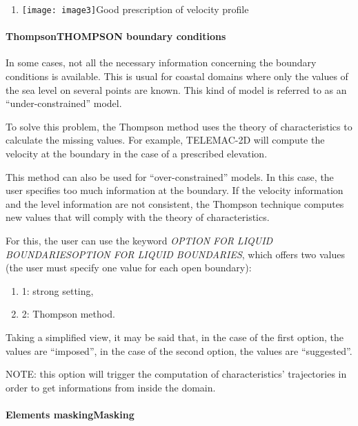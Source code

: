 \documentclass{article} %
\begin{document}
\begin{enumerate}
\item  \texttt{[image: image3]}Good prescription of velocity profile
\end{enumerate}


\paragraph{  ThompsonTHOMPSON boundary conditions}

 In some cases, not all the necessary information concerning the boundary conditions is available. This is usual for coastal domains where only the values of the sea level on several points are known. This kind of model is referred to as an ``under-constrained'' model.

 To solve this problem, the Thompson method uses the theory of characteristics to calculate the missing values. For example, TELEMAC-2D will compute the velocity at the boundary in the case of a prescribed elevation.

 This method can also be used for ``over-constrained'' models. In this case, the user specifies too much information at the boundary. If the velocity information and the level information are not consistent, the Thompson technique computes new values that will comply with the theory of characteristics.

 For this, the user can use the keyword \textit{OPTION FOR LIQUID BOUNDARIESOPTION FOR LIQUID BOUNDARIES}, which offers two values (the user must specify one value for each open boundary):

\begin{enumerate}
\item  1: strong setting,

\item  2: Thompson method.
\end{enumerate}

 Taking a simplified view, it may be said that, in the case of the first option, the values are ``imposed'', in the case of the second option, the values are ``suggested''.

 NOTE: this option will trigger the computation of characteristics' trajectories in order to get informations from inside the domain.


\paragraph{ Elements maskingMasking}
\end{document}
